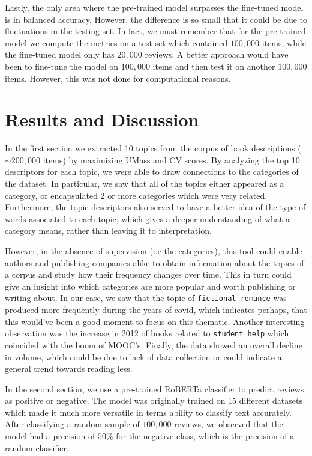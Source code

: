 \documentclass[a4paper,10pt, openright]{article}
\begin{document}
Lastly, the only area where the pre-trained model surpasses the fine-tuned model is in balanced accuracy. However, the difference is so small that it could be due to fluctuations in the testing set. In fact, we must remember that for the pre-trained model we compute the metrics on a test set which contained $100,000$ items, while the fine-tuned model only has $20,000$ reviews. A better approach would have been to fine-tune the model on $100,000$ items and then test it on another $100,000$ items. However, this was not done for computational reasons. 

\section{Results and Discussion }

In the first section we extracted 10 topics from the corpus of book descriptions ( $\sim 200,000$ items) by maximizing UMass and CV scores. By analyzing the top 10 descriptors for each topic, we were able to draw connections to the categories of the dataset. In particular, we saw that all of the topics either appeared as a category, or encapsulated 2 or more categories which were very related. Furthermore, the topic descriptors also served to have a better idea of the type of words associated to each topic, which gives a deeper understanding of what a category means, rather than leaving it to interpretation. 

However, in the absence of supervision (i.e the categories), this tool could enable authors and publishing companies alike to obtain information about the topics of a corpus and study how their frequency changes over time. This in turn could give an insight into which categories are more popular and worth publishing or writing about. In our case, we saw that the topic of \texttt{fictional romance} was produced more frequently during the years of covid, which indicates perhaps, that this would've been a good moment to focus on this thematic. Another interesting observation was the increase in 2012 of books related to \texttt{student help} which coincided with the boom of MOOC's. Finally, the data showed an overall decline in volume, which could be due to lack of data collection or could indicate a general trend towards reading less. 

In the second section, we use a pre-trained RoBERTa classifier to predict reviews as positive or negative. The model was originally trained on 15 different datasets which made it much more versatile in terms ability to classify text accurately. After classifying a random sample of $100,000$ reviews, we observed that the model had a precision of $50\%$ for the negative class, which is the precision of a random classifier. 
\end{document}
